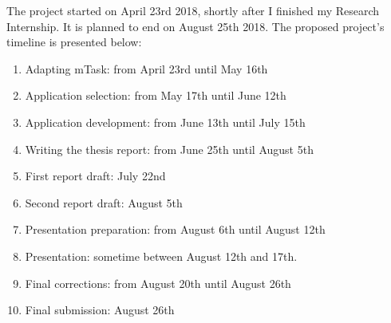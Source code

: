 \documentclass{article}
\begin{document}
The project started on April 23rd 2018, shortly after I finished my Research Internship. It is planned to end on August 25th 2018. The proposed project's timeline is presented below:

\begin{enumerate}
    \item Adapting mTask: from April 23rd until May 16th
    \item Application selection: from May 17th until June 12th 
    \item Application development: from June 13th until July 15th
    \item Writing the thesis report: from June 25th until August 5th
    \item First report draft: July 22nd
    \item Second report draft: August 5th
    \item Presentation preparation: from August 6th until August 12th
    \item Presentation: sometime between August 12th and 17th. 
    \item Final corrections: from August 20th until August 26th
    \item Final submission: August 26th
\end{enumerate}

\clearpage

\printglossary[type=\acronymtype]
\end{document}

